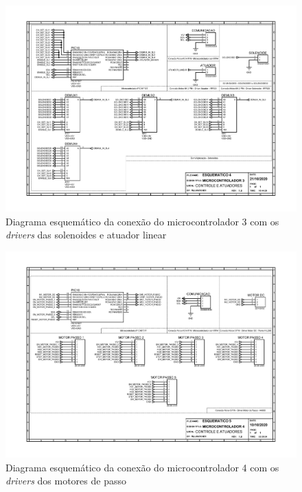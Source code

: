 \begin{apendicesenv}
\begin{landscape}
\begin{figure}[H]
    \centering
    \includegraphics[width=1.25\textwidth, height=2\textheight,keepaspectratio]{figuras/eletronica/esquematicos/esquematico_4_micro3.pdf}
    \caption{Diagrama esquemático da conexão do microcontrolador 3 com os \textit{drivers} das solenoides e atuador linear}
    \label{fig:esquematico_4}
\end{figure}
\end{landscape}

\begin{landscape}
\begin{figure}[H]
    \centering
    \includegraphics[width=1.25\textwidth, height=2\textheight,keepaspectratio]{figuras/eletronica/esquematicos/esquematico_5_micro4.pdf}
    \caption{Diagrama esquemático da conexão do microcontrolador 4 com os \textit{drivers} dos motores de passo}
    \label{fig:esquematico_5}
\end{figure}
\end{landscape}


\end{apendicesenv}
